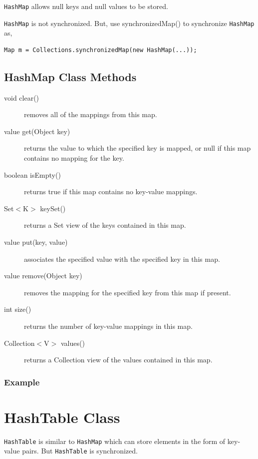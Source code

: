\documentclass[11pt,a4paper]{article}
\begin{document}
\texttt{HashMap} allows null keys and null values to be stored.

\texttt{HashMap} is not synchronized. But, use synchronizedMap() to synchronize \texttt{HashMap} as,
\begin{lstlisting}[numbers=none]
Map m = Collections.synchronizedMap(new HashMap(...));
\end{lstlisting}

\subsection*{HashMap Class Methods}
\begin{description}
\item [void clear()] removes all of the mappings from this map.

\item [value get(Object key)] returns the value to which the specified key is mapped, or null if this map contains no mapping for the key.

\item [boolean isEmpty()] returns true if this map contains no key-value mappings.

\item [Set$<$K$>$ keySet()] returns a Set view of the keys contained in this map.

\item [value put(key, value)] associates the specified value with the specified key in this map.

\item [value remove(Object key)] removes the mapping for the specified key from this map if present.

\item [int size()] returns the number of key-value mappings in this map.

\item [Collection$<$V$>$ values()] returns a Collection view of the values contained in this map.
\end{description}

\subsubsection*{Example}



\section*{HashTable Class}
\texttt{HashTable} is similar to \texttt{HashMap} which can store elements in the form of key-value pairs. But \texttt{HashTable} is synchronized.
\end{document}
